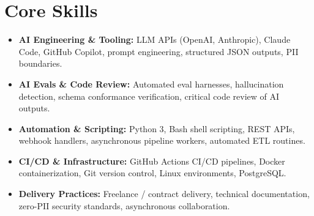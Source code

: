 \documentclass[a4paper,10pt]{article}
\begin{document}
\section{Core Skills}
\begin{itemize}
  \item \textbf{AI Engineering \& Tooling:} LLM APIs (OpenAI, Anthropic), Claude Code, GitHub Copilot, prompt engineering, structured JSON outputs, PII boundaries.
  \item \textbf{AI Evals \& Code Review:} Automated eval harnesses, hallucination detection, schema conformance verification, critical code review of AI outputs.
  \item \textbf{Automation \& Scripting:} Python 3, Bash shell scripting, REST APIs, webhook handlers, asynchronous pipeline workers, automated ETL routines.
  \item \textbf{CI/CD \& Infrastructure:} GitHub Actions CI/CD pipelines, Docker containerization, Git version control, Linux environments, PostgreSQL.
  \item \textbf{Delivery Practices:} Freelance / contract delivery, technical documentation, zero-PII security standards, asynchronous collaboration.
\end{itemize}
\end{document}

